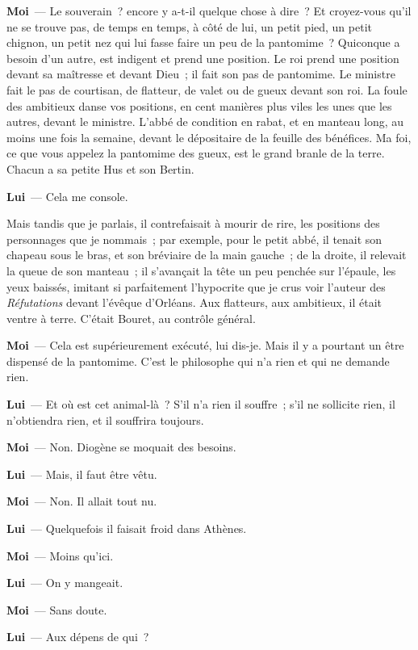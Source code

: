 \documentclass[french,twoside]{book} %
\newcommand{\labelchar}[1]{\textbf{\color{rubric} #1}}
\begin{document}
\labelchar{Moi} — Le souverain ? encore y a-t-il quelque chose à dire ? Et croyez-vous qu’il ne se trouve pas, de temps en temps, à côté de lui, un petit pied, un petit chignon, un petit nez qui lui fasse faire un peu de la pantomime ? Quiconque a besoin d’un autre, est indigent et prend une position. Le roi prend une position devant sa maîtresse et devant Dieu ; il fait son pas de pantomime. Le ministre fait le pas de courtisan, de flatteur, de valet ou de gueux devant son roi. La foule des ambitieux danse vos positions, en cent manières plus viles les unes que les autres, devant le ministre. L’abbé de condition en rabat, et en manteau long, au moins une fois la semaine, devant le dépositaire de la feuille des bénéfices. Ma foi, ce que vous appelez la pantomime des gueux, est le grand branle de la terre. Chacun a sa petite Hus et son Bertin.\par
\labelchar{Lui} — Cela me console.\par
Mais tandis que je parlais, il contrefaisait à mourir de rire, les positions des personnages que je nommais ; par exemple, pour le petit abbé, il tenait son chapeau sous le bras, et son bréviaire de la main gauche ; de la droite, il relevait la queue de son manteau ; il s’avançait la tête un peu penchée sur l’épaule, les yeux baissés, imitant si parfaitement l’hypocrite que je crus voir l’auteur des \emph{Réfutations} devant l’évêque d’Orléans. Aux flatteurs, aux ambitieux, il était ventre à terre. C’était Bouret, au contrôle général.\par
\labelchar{Moi} — Cela est supérieurement exécuté, lui dis-je. Mais il y a pourtant un être dispensé de la pantomime. C’est le philosophe qui n’a rien et qui ne demande rien.\par
\labelchar{Lui} — Et où est cet animal-là ? S’il n’a rien il souffre ; s’il ne sollicite rien, il n’obtiendra rien, et il souffrira toujours.\par
\labelchar{Moi} — Non. Diogène se moquait des besoins.\par
\labelchar{Lui} — Mais, il faut être vêtu.\par
\labelchar{Moi} — Non. Il allait tout nu.\par
\labelchar{Lui} — Quelquefois il faisait froid dans Athènes.\par
\labelchar{Moi} — Moins qu’ici.\par
\labelchar{Lui} — On y mangeait.\par
\labelchar{Moi} — Sans doute.\par
\labelchar{Lui} — Aux dépens de qui ?\par
\end{document}
